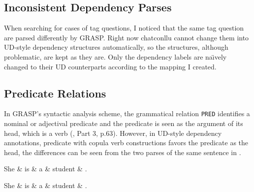 \subsection{Inconsistent Dependency Parses}

When searching for cases of tag questions, I noticed that the same tag question are parsed differently by GRASP. Right now chatconllu cannot change them into UD-style dependency structures automatically, so the structures, although problematic, are kept as they are. Only the dependency labels are na\"{\i}vely changed to their UD counterparts according to the mapping I created.

\subsection{Predicate Relations}

In GRASP's syntactic analysis scheme, the grammatical relation \texttt{PRED} identifies a nominal or adjectival predicate and the predicate is seen as the argument of its head, which is a verb (\cite{Macwhinney2000}, Part 3, p.63). However, in UD-style dependency annotations, predicate with copula verb constructions favors the predicate as the head, the differences can be seen from the two parses of the same sentence in .\\

\begin{minipage}[b]{0.5\linewidth}
\begin{dependency}
    \begin{deptext}[column sep=0.5cm]
    She \& is \& a \& student \& .\\
    \end{deptext}
\end{dependency}
\end{minipage}
\hfill
\begin{minipage}[b]{0.5\linewidth}
\begin{dependency}
    \begin{deptext}[column sep=0.5cm]
    She \& is \& a \& student \& .\\
    \end{deptext}
\end{dependency}
\end{minipage}\label{fig:copula}
\clearpage

